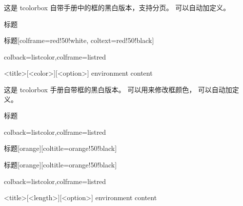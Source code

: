 \documentclass[fontset=none]{ctexart}
\begin{document}
	这是 tcolorbox 自带手册中的框的黑白版本，支持分页。  可以自动加定义。
	
	\begin{dispExample}
		\begin{ascolorbox2}{标题}
			\zhlipsum[1]
		\end{ascolorbox2}
	\end{dispExample}
	
	\begin{dispExample}
		\begin{ascolorbox2}{标题}[colframe=red!50!white, coltext=red!50!black]
			\zhlipsum[1]
		\end{ascolorbox2}
	\end{dispExample}
	
	\begin{dispListing*}{colback=listcolor,colframe=listred}
		\begin{ascolorbox3}{<title>}[<color>][<option>]
			environment content
		\end{ascolorbox3}
	\end{dispListing*}
	
	这是 tcolorbox 手册自带框的黑白版本。 可以用来修改框颜色， 可以自动加定义。
	
	\begin{dispExample}
		\begin{ascolorbox3}{标题}
			\zhlipsum[1]
		\end{ascolorbox3}
	\end{dispExample}
	
	
	\begin{dispListing*}{colback=listcolor,colframe=listred}
		\begin{ascolorbox3}{标题}[orange][coltitle=orange!50!black]
			\zhlipsum[1]
		\end{ascolorbox3}
	\end{dispListing*}
	
	
	\begin{ascolorbox3}{标题}[orange][coltitle=orange!50!black]
		\zhlipsum[1]
	\end{ascolorbox3}
	
	
	
	
	
	
	\begin{dispListing*}{colback=listcolor,colframe=listred}
		\begin{ascolorbox4}[<subtitle>]{<title>}[<length>][<option>]
			environment content
		\end{ascolorbox4}
	\end{dispListing*}
	
\end{document}
